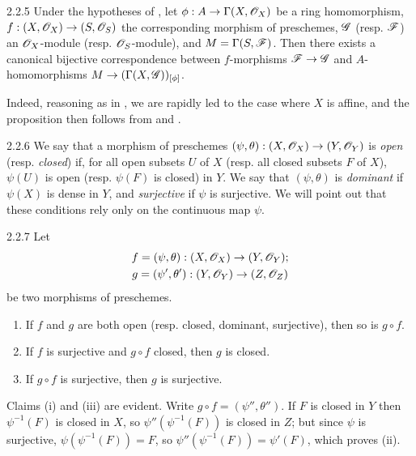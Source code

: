 \begin{envs}[Proposition]{2.2.5}
\label{prop-1.2.2.5}
Under the hypotheses of , let
$\phi:A\to\Gamma(X,\mathscr{O}_X)$ be a ring homomorphism,
$f:(X,\mathscr{O}_X)\to(S,\mathscr{O}_S)$ the corresponding morphism of preschemes,
$\mathscr{G}$ (resp. $\mathscr{F}$) an $\mathscr{O}_X$-module (resp. $\mathscr{O}_S$-module), and
$M=\Gamma(S,\mathscr{F})$. Then there exists a canonical bijective
correspondence between $f$-morphisms $\mathscr{F}\to\mathscr{G}$  and
$A$-homomorphisms $M\to(\Gamma(X,\mathscr{G}))_{[\phi]}$.
\end{envs}

Indeed, reasoning as in , we are rapidly led to the case where $X$ is
affine, and the proposition then follows from  and .

\begin{env}{2.2.6}
\label{env-1.2.2.6}
We say that a morphism of preschemes
$(\psi,\theta):(X,\mathscr{O}_X)\to(Y,\mathscr{O}_Y)$ is \emph{open} (resp. \emph{closed})
if, for all open subsets $U$ of $X$ (resp. all closed subsets $F$ of $X$),
$\psi(U)$ is open (resp. $\psi(F)$ is closed) in $Y$. We say that
$(\psi,\theta)$ is \emph{dominant} if $\psi(X)$ is dense in $Y$, and
\emph{surjective} if $\psi$ is surjective. We will point out that these
conditions rely only on the continuous map $\psi$.
\end{env}

\begin{envs}[Proposition]{2.2.7}
\label{prop-1.2.2.7}
Let
\begin{gather*}
  f=(\psi,\theta):(X,\mathscr{O}_X)\to(Y,\mathscr{O}_Y);\\
  g=(\psi',\theta'):(Y,\mathscr{O}_Y)\to(Z,\mathscr{O}_Z)
\end{gather*}
be two morphisms of
preschemes.
\begin{enumerate}[label=\rm{(\roman*)}]
  \item If $f$ and $g$ are both open (resp. closed, dominant, surjective),
        then so is $g\circ f$.
  \item If $f$ is surjective and $g\circ f$ closed, then $g$ is closed.
  \item If $g\circ f$ is surjective, then $g$ is surjective.
\end{enumerate}
\end{envs}
Claims (i) and (iii) are evident. Write $g\circ f=(\psi'',\theta'')$.
If $F$ is closed in $Y$ then $\psi^{-1}(F)$ is closed in $X$, so
$\psi''(\psi^{-1}(F))$ is closed in $Z$; but since $\psi$ is surjective,
$\psi(\psi^{-1}(F))=F$, so $\psi''(\psi^{-1}(F))=\psi'(F)$, which proves (ii).

